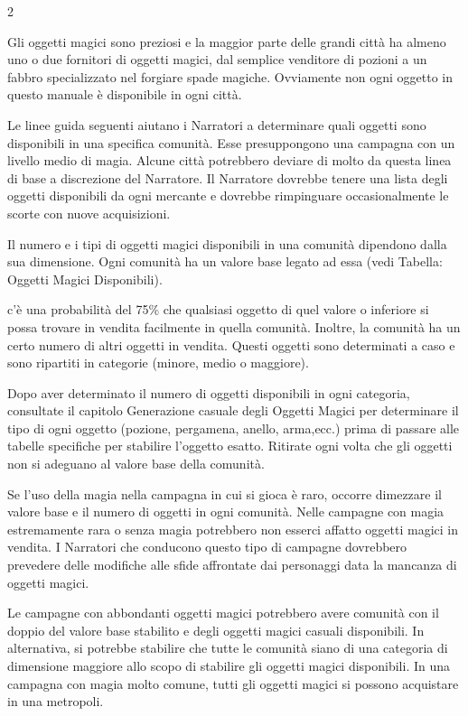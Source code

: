 \begin{multicols}{2}

\bigskip

Gli oggetti magici sono preziosi e la maggior parte delle grandi città ha almeno uno o due fornitori di oggetti magici, dal semplice venditore di pozioni a un fabbro specializzato nel forgiare spade magiche. Ovviamente non ogni oggetto in questo manuale è disponibile in ogni città.

Le linee guida seguenti aiutano i Narratori a determinare quali oggetti sono disponibili in una specifica comunità. Esse presuppongono una campagna con un livello medio di magia. Alcune città potrebbero deviare di molto da questa linea di base a discrezione del Narratore. Il Narratore dovrebbe tenere una lista degli oggetti disponibili da ogni mercante e dovrebbe rimpinguare occasionalmente le scorte con nuove acquisizioni.

Il numero e i tipi di oggetti magici disponibili in una comunità dipendono dalla sua dimensione. Ogni comunità ha un valore base legato ad essa (vedi Tabella: Oggetti Magici Disponibili).

c'è una probabilità del 75\% che qualsiasi oggetto di quel valore o inferiore si possa trovare in vendita facilmente in quella comunità. Inoltre, la comunità ha un certo numero di altri oggetti in vendita. Questi oggetti sono determinati a caso e sono ripartiti in categorie (minore, medio o maggiore).

Dopo aver determinato il numero di oggetti disponibili in ogni categoria, consultate il capitolo Generazione casuale degli Oggetti Magici per determinare il tipo di ogni oggetto (pozione, pergamena, anello, arma,ecc.) prima di passare alle tabelle specifiche per stabilire l'oggetto esatto. Ritirate ogni volta che gli oggetti non si adeguano al valore base della comunità.

Se l'uso della magia nella campagna in cui si gioca è raro, occorre dimezzare il valore base e il numero di oggetti in ogni comunità. Nelle campagne con magia estremamente rara o senza magia potrebbero non esserci affatto oggetti magici in vendita. I Narratori che conducono questo tipo di campagne dovrebbero prevedere delle modifiche alle sfide affrontate dai personaggi data la mancanza di oggetti magici.

Le campagne con abbondanti oggetti magici potrebbero avere comunità con il doppio del valore base stabilito e degli oggetti magici casuali disponibili. In alternativa, si potrebbe stabilire che tutte le comunità siano di una categoria di dimensione maggiore allo scopo di stabilire gli oggetti magici disponibili. In una campagna con magia molto comune, tutti gli oggetti magici si possono acquistare in una metropoli.


\end{multicols}
